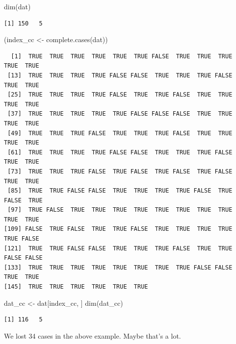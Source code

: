 \documentclass[
]{book}
\newenvironment{Shaded}{\begin{snugshade}}{\end{snugshade}}
\newcommand{\FunctionTok}[1]{\textcolor[rgb]{0.00,0.00,0.00}{#1}}
\newcommand{\NormalTok}[1]{#1}
\newcommand{\OtherTok}[1]{\textcolor[rgb]{0.56,0.35,0.01}{#1}}
\begin{document}
\begin{Shaded}
\begin{Highlighting}[]
\FunctionTok{dim}\NormalTok{(dat)}
\end{Highlighting}
\end{Shaded}

\begin{verbatim}
[1] 150   5
\end{verbatim}

\begin{Shaded}
\begin{Highlighting}[]
\NormalTok{(index\_cc }\OtherTok{\textless{}{-}} \FunctionTok{complete.cases}\NormalTok{(dat))}
\end{Highlighting}
\end{Shaded}

\begin{verbatim}
  [1]  TRUE  TRUE  TRUE  TRUE  TRUE  TRUE FALSE  TRUE  TRUE  TRUE  TRUE  TRUE
 [13]  TRUE  TRUE  TRUE  TRUE FALSE FALSE  TRUE  TRUE  TRUE FALSE  TRUE  TRUE
 [25]  TRUE  TRUE  TRUE  TRUE FALSE  TRUE  TRUE FALSE  TRUE  TRUE  TRUE  TRUE
 [37]  TRUE  TRUE  TRUE  TRUE  TRUE FALSE FALSE FALSE  TRUE  TRUE  TRUE  TRUE
 [49]  TRUE  TRUE  TRUE FALSE  TRUE  TRUE  TRUE FALSE  TRUE  TRUE  TRUE  TRUE
 [61]  TRUE  TRUE  TRUE  TRUE FALSE FALSE  TRUE  TRUE  TRUE FALSE  TRUE  TRUE
 [73]  TRUE  TRUE  TRUE FALSE  TRUE FALSE  TRUE FALSE  TRUE FALSE  TRUE  TRUE
 [85]  TRUE  TRUE FALSE FALSE  TRUE  TRUE  TRUE  TRUE FALSE  TRUE FALSE  TRUE
 [97]  TRUE FALSE  TRUE  TRUE  TRUE  TRUE  TRUE  TRUE  TRUE  TRUE  TRUE  TRUE
[109] FALSE  TRUE FALSE  TRUE  TRUE FALSE  TRUE  TRUE  TRUE  TRUE  TRUE FALSE
[121]  TRUE  TRUE FALSE FALSE  TRUE  TRUE  TRUE FALSE  TRUE  TRUE FALSE FALSE
[133]  TRUE  TRUE  TRUE  TRUE  TRUE  TRUE  TRUE  TRUE FALSE FALSE  TRUE  TRUE
[145]  TRUE  TRUE  TRUE  TRUE  TRUE  TRUE
\end{verbatim}

\begin{Shaded}
\begin{Highlighting}[]
\NormalTok{dat\_cc }\OtherTok{\textless{}{-}}\NormalTok{ dat[index\_cc, ]}
\FunctionTok{dim}\NormalTok{(dat\_cc)}
\end{Highlighting}
\end{Shaded}

\begin{verbatim}
[1] 116   5
\end{verbatim}

We lost 34 cases in the above example. Maybe that's a lot.
\end{document}
